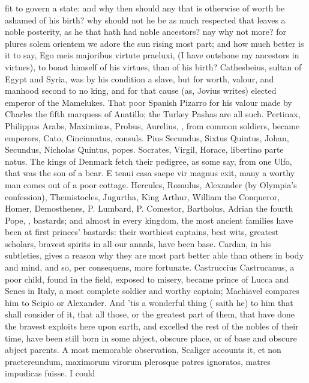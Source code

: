 {fit to govern a state: and why then should any that is otherwise of
worth be ashamed of his birth? why should not he be as much respected
that leaves a noble posterity, as he that hath had noble ancestors? nay
why not more? for plures solem orientem we adore the sun rising most
part; and how much better is it to say, Ego meis majoribus virtute
praeluxi, (I have outshone my ancestors in virtues), to boast himself
of his virtues, than of his birth? Cathesbeius, sultan of Egypt and
Syria, was by his condition a slave, but for worth, valour, and manhood
second to no king, and for that cause (as, Jovius writes) elected
emperor of the Mamelukes. That poor Spanish Pizarro for his valour made
by Charles the fifth marquess of Anatillo; the Turkey Pashas are all
such. Pertinax, Philippus Arabs, Maximinus, Probus, Aurelius, \etc{}, from
common soldiers, became emperors, Cato, Cincinnatus, \etc{} consuls. Pius
Secundus, Sixtus Quintus, Johan, Secundus, Nicholas Quintus, \etc{} popes.
Socrates, Virgil, Horace, libertino parte natus. The kings of
Denmark fetch their pedigree, as some say, from one Ulfo, that was the
son of a bear. E tenui casa saepe vir magnus exit, many a worthy
man comes out of a poor cottage. Hercules, Romulus, Alexander (by
Olympia's confession), Themistocles, Jugurtha, King Arthur, William the
Conqueror, Homer, Demosthenes, P. Lumbard, P. Comestor, Bartholus,
Adrian the fourth Pope, \etc{}, bastards; and almost in every kingdom, the
most ancient families have been at first princes' bastards: their
worthiest captains, best wits, greatest scholars, bravest spirits in
all our annals, have been base. Cardan, in his subtleties, gives
a reason why they are most part better able than others in body and
mind, and so, per consequens, more fortunate. Castruccius Castrucanus,
a poor child, found in the field, exposed to misery, became prince of
Lucca and Senes in Italy, a most complete soldier and worthy captain;
Machiavel compares him to Scipio or Alexander. And 'tis a wonderful
thing ( saith he) to him that shall consider of it, that all
those, or the greatest part of them, that have done the bravest
exploits here upon earth, and excelled the rest of the nobles of their
time, have been still born in some abject, obscure place, or of base
and obscure abject parents. A most memorable observation,
Scaliger accounts it, et non praetereundum, maximorum virorum
plerosque patres ignoratos, matres impudicas fuisse. I could
}
